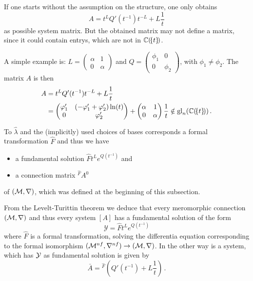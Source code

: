\begin{rem}
  If one starts without the assumption on the structure, one only obtains
  \[
    A=t^LQ'(t^{-1})t^{-L}+L\frac{1}{t}
  \]
  as possible system matrix. But the obtained matrix may not define a matrix,
  since it could contain entrys, which are not in $\mathbb{C}(\!\{t\}\!)$.

  A simple example is:
  $L=\begin{pmatrix} \alpha & 1 \\ 0 & \alpha \end{pmatrix}$
  and
  $Q=\begin{pmatrix} \phi_1 & 0 \\ 0 & \phi_2 \end{pmatrix}$,
  with $\phi_1\neq\phi_2$.
  The matrix $A$ is then
  \begin{align*}
    A  &=t^LQ'(t^{-1})t^{-L}+L\frac{1}{t}
    \\ &=
    \begin{pmatrix}
      \varphi_1' & (-\varphi_1'+\varphi_2')\ln(t)
      \\0     & \varphi_2'
    \end{pmatrix}
    +
    \begin{pmatrix}
        \alpha & 1
        \\ 0   & \alpha
    \end{pmatrix} \frac{1}{t}
    \notin\operatorname{gl}_n(\mathbb{C}(\!\{t\}\!))
    \,.
  \end{align*}
\end{rem}
To $\hat\lambda$ and the (implicitly) used choices of bases corresponds a
formal transformation $\hat F$ and thus we have
\begin{itemize}
  \item a fundamental solution $\hat Ft^L e^{Q(t^{-1})}$ and
  \item a connection matrix ${}^{\hat F}\!A^0$
\end{itemize}
of $(\mathcal{M},\nabla)$, which was defined at the beginning of this subsection.
\begin{cor}
  From the Levelt-Turittin theorem we deduce that every meromorphic connection
  $(\mathcal{M},\nabla)$ and thus every system $[A]$ has a fundamental solution of the
  form
  \[
    \mathcal{Y}=\hat F t^L e^{Q(t^{-1})}
  \]
  where $\hat F$ is a formal transformation, solving the differentia equation
  corresponding to the formal isomorphism
  $(\mathcal{M}^{nf},\nabla^{nf})\to(\mathcal{M},\nabla)$.
  In the other way is a system, which has $\mathcal{Y}$ as fundamental solution is
  given by
  \[
    \bar A={}^{\hat F}\!\left(Q'(t^{-1})+L\frac{1}{t}\right) \,.
  \]
  \begin{comment}
    \begin{s-rem}
      It is always possible to permutate the columns of a fundamental solution
      by
      \[
        P^{-1}\mathcal{Y}P=\hat F t^{P^{-1}LP} e^{P^{-1}Q(t^{-1})P}
      \]
      with a permutation matrix $P$ and \rewrite{obtain another fundamental
      solution for the same system} (cf.\ \cite[73]{Loday2014}).
    \end{s-rem}
  \end{comment}
\end{cor}
